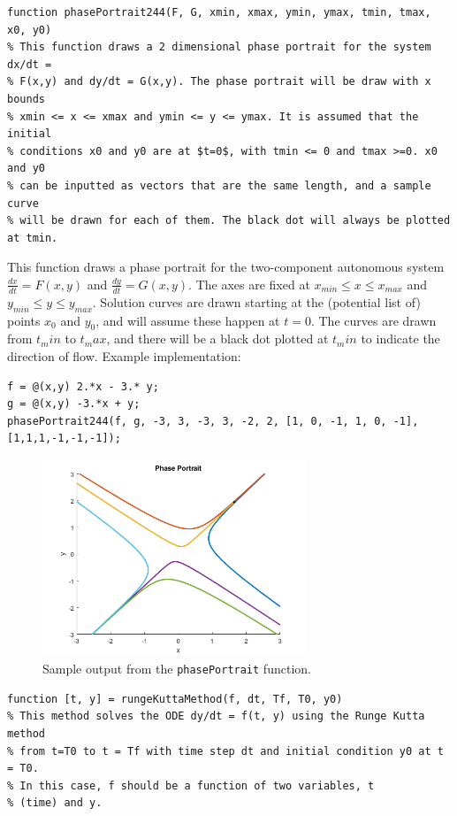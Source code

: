 \documentclass{ximera}
\begin{document}
\begin{verbatim}
function phasePortrait244(F, G, xmin, xmax, ymin, ymax, tmin, tmax, x0, y0)
% This function draws a 2 dimensional phase portrait for the system dx/dt =
% F(x,y) and dy/dt = G(x,y). The phase portrait will be draw with x bounds
% xmin <= x <= xmax and ymin <= y <= ymax. It is assumed that the initial 
% conditions x0 and y0 are at $t=0$, with tmin <= 0 and tmax >=0. x0 and y0
% can be inputted as vectors that are the same length, and a sample curve
% will be drawn for each of them. The black dot will always be plotted at tmin.
\end{verbatim}

This function draws a phase portrait for the two-component autonomous system $\frac{dx}{dt} = F(x,y)$ and $\frac{dy}{dt} = G(x,y)$. The axes are fixed at $x_{min} \leq x \leq x_{max}$ and $y_{min} \leq y \leq y_{max}$. Solution curves are drawn starting at the (potential list of) points $x_0$ and $y_0$, and will assume these happen at $t=0$. The curves are drawn from $t_min$ to $t_max$, and there will be a black dot plotted at $t_min$ to indicate the direction of flow. Example implementation:

\begin{verbatim}
f = @(x,y) 2.*x - 3.* y;
g = @(x,y) -3.*x + y;
phasePortrait244(f, g, -3, 3, -3, 3, -2, 2, [1, 0, -1, 1, 0, -1], [1,1,1,-1,-1,-1]);
\end{verbatim}

\begin{figure}[h!]
    \centering
    \includegraphics[width=0.7\textwidth]{figures/MatlabDemo_phasePortrait.png}
    \caption{Sample output from the \texttt{phasePortrait} function.}
    \label{fig:MatlabDemo_phasePortrait}
\end{figure}

\begin{verbatim}
function [t, y] = rungeKuttaMethod(f, dt, Tf, T0, y0)
% This method solves the ODE dy/dt = f(t, y) using the Runge Kutta method
% from t=T0 to t = Tf with time step dt and initial condition y0 at t = T0.
% In this case, f should be a function of two variables, t
% (time) and y.
\end{verbatim}
\end{document}
